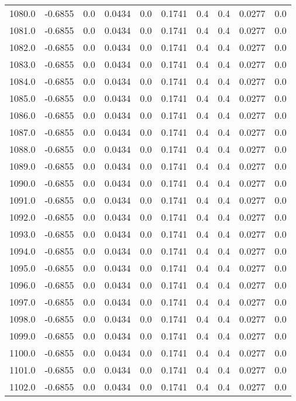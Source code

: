 \begin{longtable}{lrrrrrrrrr}
1080.0 & -0.6855 & 0.0 & 0.0434 & 0.0 & 0.1741 & 0.4 & 0.4 & 0.0277 & 0.0 \\
1081.0 & -0.6855 & 0.0 & 0.0434 & 0.0 & 0.1741 & 0.4 & 0.4 & 0.0277 & 0.0 \\
1082.0 & -0.6855 & 0.0 & 0.0434 & 0.0 & 0.1741 & 0.4 & 0.4 & 0.0277 & 0.0 \\
1083.0 & -0.6855 & 0.0 & 0.0434 & 0.0 & 0.1741 & 0.4 & 0.4 & 0.0277 & 0.0 \\
1084.0 & -0.6855 & 0.0 & 0.0434 & 0.0 & 0.1741 & 0.4 & 0.4 & 0.0277 & 0.0 \\
1085.0 & -0.6855 & 0.0 & 0.0434 & 0.0 & 0.1741 & 0.4 & 0.4 & 0.0277 & 0.0 \\
1086.0 & -0.6855 & 0.0 & 0.0434 & 0.0 & 0.1741 & 0.4 & 0.4 & 0.0277 & 0.0 \\
1087.0 & -0.6855 & 0.0 & 0.0434 & 0.0 & 0.1741 & 0.4 & 0.4 & 0.0277 & 0.0 \\
1088.0 & -0.6855 & 0.0 & 0.0434 & 0.0 & 0.1741 & 0.4 & 0.4 & 0.0277 & 0.0 \\
1089.0 & -0.6855 & 0.0 & 0.0434 & 0.0 & 0.1741 & 0.4 & 0.4 & 0.0277 & 0.0 \\
1090.0 & -0.6855 & 0.0 & 0.0434 & 0.0 & 0.1741 & 0.4 & 0.4 & 0.0277 & 0.0 \\
1091.0 & -0.6855 & 0.0 & 0.0434 & 0.0 & 0.1741 & 0.4 & 0.4 & 0.0277 & 0.0 \\
1092.0 & -0.6855 & 0.0 & 0.0434 & 0.0 & 0.1741 & 0.4 & 0.4 & 0.0277 & 0.0 \\
1093.0 & -0.6855 & 0.0 & 0.0434 & 0.0 & 0.1741 & 0.4 & 0.4 & 0.0277 & 0.0 \\
1094.0 & -0.6855 & 0.0 & 0.0434 & 0.0 & 0.1741 & 0.4 & 0.4 & 0.0277 & 0.0 \\
1095.0 & -0.6855 & 0.0 & 0.0434 & 0.0 & 0.1741 & 0.4 & 0.4 & 0.0277 & 0.0 \\
1096.0 & -0.6855 & 0.0 & 0.0434 & 0.0 & 0.1741 & 0.4 & 0.4 & 0.0277 & 0.0 \\
1097.0 & -0.6855 & 0.0 & 0.0434 & 0.0 & 0.1741 & 0.4 & 0.4 & 0.0277 & 0.0 \\
1098.0 & -0.6855 & 0.0 & 0.0434 & 0.0 & 0.1741 & 0.4 & 0.4 & 0.0277 & 0.0 \\
1099.0 & -0.6855 & 0.0 & 0.0434 & 0.0 & 0.1741 & 0.4 & 0.4 & 0.0277 & 0.0 \\
1100.0 & -0.6855 & 0.0 & 0.0434 & 0.0 & 0.1741 & 0.4 & 0.4 & 0.0277 & 0.0 \\
1101.0 & -0.6855 & 0.0 & 0.0434 & 0.0 & 0.1741 & 0.4 & 0.4 & 0.0277 & 0.0 \\
1102.0 & -0.6855 & 0.0 & 0.0434 & 0.0 & 0.1741 & 0.4 & 0.4 & 0.0277 & 0.0 \\

\end{longtable}
